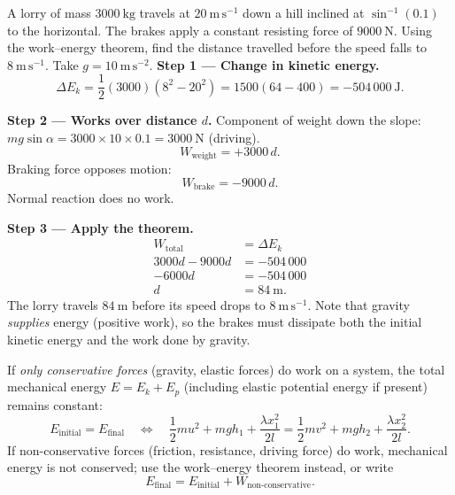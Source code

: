 \documentclass[11pt]{article}
\begin{document}
\begin{exoresolu}
A lorry of mass $3000\ \mathrm{kg}$ travels at $20\ \mathrm{m\,s^{-1}}$ down a hill inclined at $\sin^{-1}(0.1)$ to the horizontal. The brakes apply a constant resisting force of $9000\ \mathrm{N}$. Using the work–energy theorem, find the distance travelled before the speed falls to $8\ \mathrm{m\,s^{-1}}$. Take $g = 10\ \mathrm{m\,s^{-2}}$.
\tcblower
\textbf{Step 1 — Change in kinetic energy.}
\[
\Delta E_k = \frac{1}{2}(3000)\left(8^2 - 20^2\right) = 1500(64 - 400) = -504\,000\ \mathrm{J}.
\]

\textbf{Step 2 — Works over distance $d$.} 
Component of weight down the slope: $mg\sin\alpha = 3000 \times 10 \times 0.1 = 3000\ \mathrm{N}$ (driving).
\[
W_{\text{weight}} = +3000\,d.
\]
Braking force opposes motion:
\[
W_{\text{brake}} = -9000\,d.
\]
Normal reaction does no work.

\textbf{Step 3 — Apply the theorem.}
\begin{align*}
W_{\text{total}} &= \Delta E_k\\
3000d - 9000d &= -504\,000\\
-6000d &= -504\,000\\
d &= 84\ \mathrm{m}.
\end{align*}
The lorry travels $84\ \mathrm{m}$ before its speed drops to $8\ \mathrm{m\,s^{-1}}$. Note that gravity \emph{supplies} energy (positive work), so the brakes must dissipate both the initial kinetic energy and the work done by gravity.
\end{exoresolu}

\begin{propriete}
If \emph{only conservative forces} (gravity, elastic forces) do work on a system, the total mechanical energy $E = E_k + E_p$ (including elastic potential energy if present) remains constant:
\[
E_{\text{initial}} = E_{\text{final}} \quad\Longleftrightarrow\quad \frac{1}{2}mu^2 + mgh_1 + \frac{\lambda x_1^2}{2l} = \frac{1}{2}mv^2 + mgh_2 + \frac{\lambda x_2^2}{2l}.
\]
If non-conservative forces (friction, resistance, driving force) do work, mechanical energy is not conserved; use the work–energy theorem instead, or write
\[
E_{\text{final}} = E_{\text{initial}} + W_{\text{non-conservative}}.
\]
\end{propriete}
\end{document}
